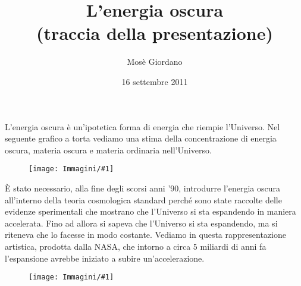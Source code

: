 \documentclass[10pt,a4paper,fleqn,draft]{article}
\title{L'energia oscura\\(traccia della presentazione)}
\author{Mosè Giordano}
\date{16 settembre 2011}
\newcommand{\figura}[1]{
  \begin{figure}[h!]
    \texttt{[image: Immagini/\#1]}
  \end{figure}
}
\begin{document}
\maketitle
L'energia oscura è un'ipotetica forma di energia che riempie l'Universo. Nel
seguente grafico a torta vediamo una stima della concentrazione di energia
oscura, materia oscura e materia ordinaria nell'Universo.
\figura{DarkMatterPie}

È stato necessario, alla fine degli scorsi anni '90, introdurre l'energia oscura
all'interno della teoria cosmologica standard perché sono state raccolte delle
evidenze sperimentali che mostrano che l'Universo si sta espandendo in maniera
accelerata. Fino ad allora si sapeva che l'Universo si sta espandendo, ma si
riteneva che lo facesse in modo costante. Vediamo in questa rappresentazione
artistica, prodotta dalla NASA, che intorno a circa $5$ miliardi di anni fa
l'espansione avrebbe iniziato a subire un'accelerazione.
\figura{800px-CMB_Timeline300_no_WMAP}
\end{document}
